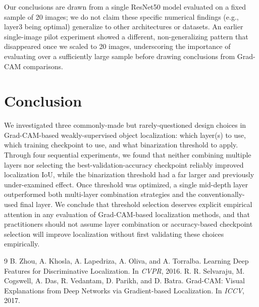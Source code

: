 \documentclass[11pt]{article}
\begin{document}
Our conclusions are drawn from a single ResNet50 model evaluated on a fixed sample of 20 images; we do not claim these specific numerical findings (e.g., layer3 being optimal) generalize to other architectures or datasets. An earlier single-image pilot experiment showed a different, non-generalizing pattern that disappeared once we scaled to 20 images, underscoring the importance of evaluating over a sufficiently large sample before drawing conclusions from Grad-CAM comparisons.

\section{Conclusion}

We investigated three commonly-made but rarely-questioned design choices in Grad-CAM-based weakly-supervised object localization: which layer(s) to use, which training checkpoint to use, and what binarization threshold to apply. Through four sequential experiments, we found that neither combining multiple layers nor selecting the best-validation-accuracy checkpoint reliably improved localization IoU, while the binarization threshold had a far larger and previously under-examined effect. Once threshold was optimized, a single mid-depth layer outperformed both multi-layer combination strategies and the conventionally-used final layer. We conclude that threshold selection deserves explicit empirical attention in any evaluation of Grad-CAM-based localization methods, and that practitioners should not assume layer combination or accuracy-based checkpoint selection will improve localization without first validating these choices empirically.

\begin{thebibliography}{9}
 B. Zhou, A. Khosla, A. Lapedriza, A. Oliva, and A. Torralba. Learning Deep Features for Discriminative Localization. In \emph{CVPR}, 2016.
 R. R. Selvaraju, M. Cogswell, A. Das, R. Vedantam, D. Parikh, and D. Batra. Grad-CAM: Visual Explanations from Deep Networks via Gradient-based Localization. In \emph{ICCV}, 2017.
\end{thebibliography}
\end{document}
